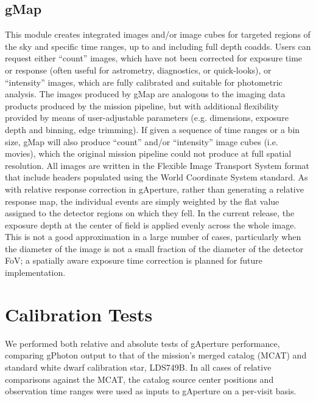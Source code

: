 \documentclass[preprint]{aastex}
\begin{document}
\subsection{gMap}
This module creates integrated images and/or image cubes for targeted regions of the sky and specific time ranges, up to and including full depth coadds. Users can request either ``count'' images, which have not been corrected for exposure time or response (often useful for astrometry, diagnostics, or quick-looks), or ``intensity'' images, which are fully calibrated and suitable for photometric analysis. The images produced by gMap are analogous to the imaging data products produced by the mission pipeline, but with additional flexibility provided by means of user-adjustable parameters (e.g. dimensions, exposure depth and binning, edge trimming). If given a sequence of time ranges or a bin size, gMap will also produce ``count'' and/or ``intensity'' image cubes (i.e. movies), which the original mission pipeline could not produce at full spatial resolution. All images are written in the Flexible Image Transport System \citep[FITS,][]{pen2010} format that include headers populated using the World Coordinate System \citep[WCS,][]{gre2002,cal2002} standard.  As with relative response correction in gAperture, rather than generating a relative response map, the individual events are simply weighted by the flat value assigned to the detector regions on which they fell. In the current release, the exposure depth at the center of field is applied evenly across the whole image. This is not a good approximation in a large number of cases, particularly when the diameter of the image is not a small fraction of the diameter of the detector FoV; a spatially aware exposure time correction is planned for future implementation.

\section{Calibration Tests}
\label{calibration}
We performed both relative and absolute tests of gAperture performance, comparing gPhoton output to that of the mission's merged catalog (MCAT) and standard white dwarf calibration star, LDS749B. In all cases of relative comparisons against the MCAT, the catalog source center positions and observation time ranges were used as inputs to gAperture on a per-visit basis.
\end{document}
